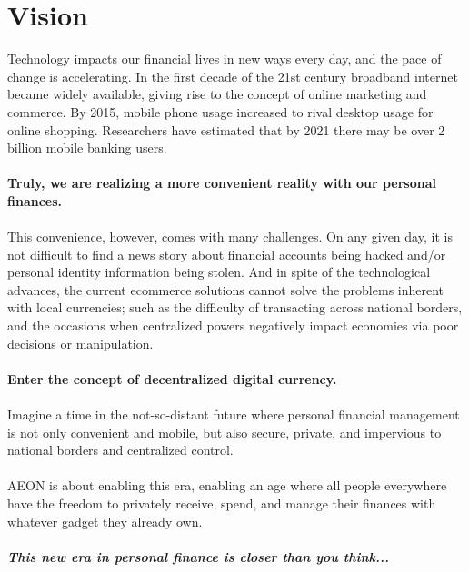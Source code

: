 
\section{Vision}
	
	Technology impacts our financial lives in new ways every day, and the pace of change is accelerating. In the first decade of the 21st century broadband internet became widely available, giving rise to the concept of online marketing and commerce. By 2015, mobile phone usage increased to rival desktop usage for online shopping. Researchers have estimated that by 2021 there may be over 2 billion mobile banking users.\\
	\\
	\textbf{Truly, we are realizing a more convenient reality with our personal finances.}\\
	\\
	This convenience, however, comes with many challenges. On any given day, it is not difficult to find a news story about financial accounts being hacked and/or personal identity information being stolen.  And in spite of the technological advances, the current ecommerce solutions cannot solve the problems inherent with local currencies; such as the difficulty of transacting across national borders, and the occasions when centralized powers negatively impact economies via poor decisions or manipulation.\\
	\\
	\textbf{Enter the concept of decentralized digital currency.}\\
	\\
	Imagine a time in the not-so-distant future where personal financial management is not only convenient and mobile, but also secure, private, and impervious to national borders and centralized control.\\
	\\
	AEON is about enabling this era, enabling an age where all people everywhere have the freedom to privately receive, spend, and manage their finances with whatever gadget they already own.\\
	\\
	\textbf{\textit{This new era in personal finance is closer than you think...}}\\
	
